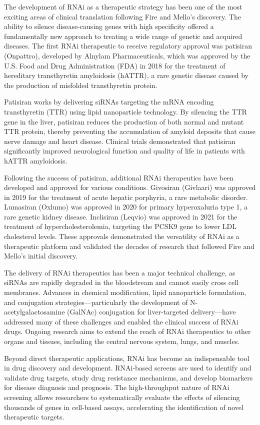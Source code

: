 The development of RNAi as a therapeutic strategy has been one of the most exciting areas of clinical translation following Fire and Mello's discovery. The ability to silence disease-causing genes with high specificity offered a fundamentally new approach to treating a wide range of genetic and acquired diseases. The first RNAi therapeutic to receive regulatory approval was patisiran (Onpattro), developed by Alnylam Pharmaceuticals, which was approved by the U.S. Food and Drug Administration (FDA) in 2018 for the treatment of hereditary transthyretin amyloidosis (hATTR), a rare genetic disease caused by the production of misfolded transthyretin protein.

Patisiran works by delivering siRNAs targeting the mRNA encoding transthyretin (TTR) using lipid nanoparticle technology. By silencing the TTR gene in the liver, patisiran reduces the production of both normal and mutant TTR protein, thereby preventing the accumulation of amyloid deposits that cause nerve damage and heart disease. Clinical trials demonstrated that patisiran significantly improved neurological function and quality of life in patients with hATTR amyloidosis.

Following the success of patisiran, additional RNAi therapeutics have been developed and approved for various conditions. Givosiran (Givlaari) was approved in 2019 for the treatment of acute hepatic porphyria, a rare metabolic disorder. Lumasiran (Oxlumo) was approved in 2020 for primary hyperoxaluria type 1, a rare genetic kidney disease. Inclisiran (Leqvio) was approved in 2021 for the treatment of hypercholesterolemia, targeting the PCSK9 gene to lower LDL cholesterol levels. These approvals demonstrated the versatility of RNAi as a therapeutic platform and validated the decades of research that followed Fire and Mello's initial discovery.

The delivery of RNAi therapeutics has been a major technical challenge, as siRNAs are rapidly degraded in the bloodstream and cannot easily cross cell membranes. Advances in chemical modification, lipid nanoparticle formulation, and conjugation strategies---particularly the development of N-acetylgalactosamine (GalNAc) conjugation for liver-targeted delivery---have addressed many of these challenges and enabled the clinical success of RNAi drugs. Ongoing research aims to extend the reach of RNAi therapeutics to other organs and tissues, including the central nervous system, lungs, and muscles.

Beyond direct therapeutic applications, RNAi has become an indispensable tool in drug discovery and development. RNAi-based screens are used to identify and validate drug targets, study drug resistance mechanisms, and develop biomarkers for disease diagnosis and prognosis. The high-throughput nature of RNAi screening allows researchers to systematically evaluate the effects of silencing thousands of genes in cell-based assays, accelerating the identification of novel therapeutic targets.

